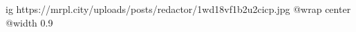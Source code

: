  
 
 
 
 

\ifcmt
  ig https://mrpl.city/uploads/posts/redactor/1wd18vf1b2u2cicp.jpg
  @wrap center
  @width 0.9
\fi
